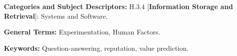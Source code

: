 \documentclass[conference]{IEEEtran}
\begin{document}
\hfill \break
\noindent\textbf{Categories and Subject Descriptors:} H.3.4 [\textbf{Information Storage and Retrieval}]: Systems and Software.


\noindent\textbf{General Terms:} Experimentation, Human Factors.


\noindent\textbf{Keywords:} Question-answering, reputation, value prediction.





















\vspace{12pt}
\end{document}
